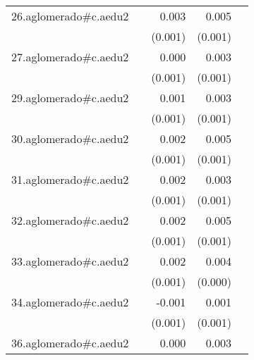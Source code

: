{\begin{longtable}{l*{4}{D{.}{.}{-1}}}
\addlinespace
26.aglomerado#c.aedu2&                     &       0.003\sym{*}  &       0.005\sym{***}&                     \\
            &                     &     (0.001)         &     (0.001)         &                     \\
\addlinespace
27.aglomerado#c.aedu2&                     &       0.000         &       0.003\sym{**} &                     \\
            &                     &     (0.001)         &     (0.001)         &                     \\
\addlinespace
29.aglomerado#c.aedu2&                     &       0.001         &       0.003\sym{***}&                     \\
            &                     &     (0.001)         &     (0.001)         &                     \\
\addlinespace
30.aglomerado#c.aedu2&                     &       0.002         &       0.005\sym{***}&                     \\
            &                     &     (0.001)         &     (0.001)         &                     \\
\addlinespace
31.aglomerado#c.aedu2&                     &       0.002         &       0.003\sym{*}  &                     \\
            &                     &     (0.001)         &     (0.001)         &                     \\
\addlinespace
32.aglomerado#c.aedu2&                     &       0.002\sym{*}  &       0.005\sym{***}&                     \\
            &                     &     (0.001)         &     (0.001)         &                     \\
\addlinespace
33.aglomerado#c.aedu2&                     &       0.002         &       0.004\sym{***}&                     \\
            &                     &     (0.001)         &     (0.000)         &                     \\
\addlinespace
34.aglomerado#c.aedu2&                     &      -0.001         &       0.001         &                     \\
            &                     &     (0.001)         &     (0.001)         &                     \\
\addlinespace
36.aglomerado#c.aedu2&                     &       0.000         &       0.003\sym{***}&                     \\

\end{longtable}}
